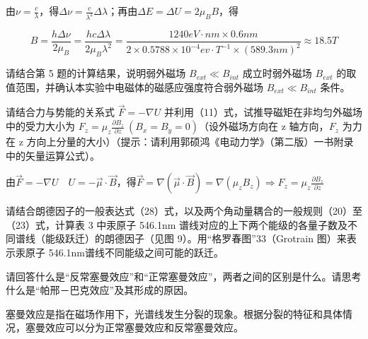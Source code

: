 \documentclass[dvipsnames, svgnames,a4paper,11pt]{article}
\begin{document}
	由$\nu = \frac{c}{\lambda}$，得$\Delta \nu = \frac{c}{\lambda^2}\Delta \lambda$；再由$\Delta E = \Delta U =2 \mu_B B$，得

	\[
		B = \frac{h \Delta \nu}{2 \mu_B} = \frac{h c \Delta \lambda}{2 \mu_B \lambda^2} = \frac{1240eV \cdot nm \times 0.6nm}{2\times 0.5788\times 10^{-4}ev\cdot T^{-1} \times (589.3nm)^2} \approx 18.5T
	\]




\begin{question}
	请结合第 5 题的计算结果，说明弱外磁场 $B_{ext} \ll B_{int}$ 成立时弱外磁场 $B_{ext}$ 的取值范围，并确认本实验中电磁体的磁感应强度符合弱外磁场 $B_{ext} \ll B_{int}$ 条件。
\end{question}






\begin{question}
	请结合力与势能的关系式 $\vec{F} = -\nabla U $ 并利用（11）式，试推导磁矩在非均匀外磁场中的受力大小为 $F_z = \mu_z \frac{\partial B_z}{\partial z} \ (B_x = B_y = 0)$（设外磁场方向在 z 轴方向，$F_z$ 为力在 z 方向上分量的大小）（提示：请利用郭硕鸿《电动力学》（第二版）一书附录中的矢量运算公式）。
\end{question}

	由$\vec{F} = -\nabla U \quad U = -\vec{\mu} \cdot \vec{B}$，得$\vec{F} = \nabla(\vec{\mu} \cdot \vec{B}) = \nabla(\mu_z B_z) \Rightarrow F_z = \mu_z \frac{\partial B_z}{\partial z} $






\begin{question}
	请结合朗德因子的一般表达式（28）式，以及两个角动量耦合的一般规则（20）至（23）式，计算表 3 中汞原子 546.1nm 谱线对应的上下两个能级的各量子数及不同谱线（能级跃迁）的朗德因子（见图 9）。用“格罗春图”33（Grotrain 图）来表示汞原子 546.1nm谱线不同能级之间可能的跃迁。
\end{question}









\begin{question}
	请回答什么是“反常塞曼效应”和“正常塞曼效应”，两者之间的区别是什么。请思考什么是“帕邢－巴克效应”及其形成的原因。
\end{question}


	塞曼效应是指在磁场作用下，光谱线发生分裂的现象。根据分裂的特征和具体情况，塞曼效应可以分为正常塞曼效应和反常塞曼效应。
\end{document}
